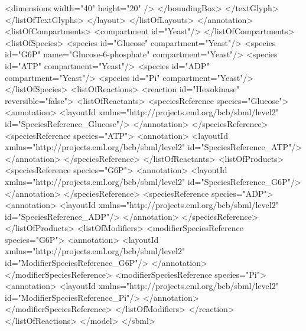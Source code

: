 \begin{example}
              <dimensions width="40" height="20" />
            </boundingBox>
          </textGlyph>
        </listOfTextGlyphs>
       </layout>
     </listOfLayouts>
    </annotation>
    <listOfCompartments>
      <compartment id="Yeast"/>
    </listOfCompartments>
    <listOfSpecies>
      <species id="Glucose" compartment="Yeast"/>
      <species id="G6P" name="Glucose-6-phosphate" compartment="Yeast"/>
      <species id="ATP" compartment="Yeast"/>
      <species id="ADP" compartment="Yeast"/>
      <species id="Pi" compartment="Yeast"/>
    </listOfSpecies>
    <listOfReactions>
      <reaction id="Hexokinase" reversible="false">
        <listOfReactants>
          <speciesReference species="Glucose">
            <annotation>
              <layoutId xmlns="http://projects.eml.org/bcb/sbml/level2"
                        id="SpeciesReference_Glucose"/>
            </annotation>
          </speciesReference>
          <speciesReference species="ATP">
            <annotation>
              <layoutId xmlns="http://projects.eml.org/bcb/sbml/level2" 
                        id="SpeciesReference_ATP"/>
            </annotation>
          </speciesReference>
        </listOfReactants>
        <listOfProducts>
          <speciesReference species="G6P">
            <annotation>
              <layoutId xmlns="http://projects.eml.org/bcb/sbml/level2" 
                        id="SpeciesReference_G6P"/>
            </annotation>
          </speciesReference>
          <speciesReference species="ADP">
            <annotation>
              <layoutId xmlns="http://projects.eml.org/bcb/sbml/level2"
                        id="SpeciesReference_ADP"/>
            </annotation>
          </speciesReference>
        </listOfProducts>
        <listOfModifiers>
          <modifierSpeciesReference species="G6P">
            <annotation>
              <layoutId xmlns="http://projects.eml.org/bcb/sbml/level2"
                        id="ModifierSpeciesReference_G6P"/>
            </annotation>
          </modifierSpeciesReference>
          <modifierSpeciesReference species="Pi">
            <annotation>
              <layoutId xmlns="http://projects.eml.org/bcb/sbml/level2" 
                        id="ModifierSpeciesReference_Pi"/>
            </annotation>
          </modifierSpeciesReference>
        </listOfModifiers>
      </reaction>
    </listOfReactions>
  </model>
</sbml>
\end{example}
